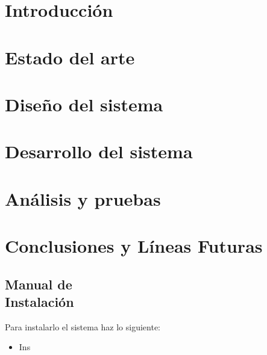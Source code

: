 \documentclass[12pt, a4paper, twoside]{article}
\begin{document}


\clearpage
\setcounter{page}{1}



\newpage



\newpage



\tableofcontents

\section{Introducción}


\section{Estado del arte}


\section{Diseño del sistema}


\section{Desarrollo del sistema}


\section{Análisis y pruebas}


\section{Conclusiones y Líneas Futuras}


\printbibliography
\newpage

\begin{umaappendices}
  \section{Manual de \\ Instalación}
  Para instalarlo el sistema haz lo siguiente:
  \begin{itemize}
    \item Ins
  \end{itemize}

\end{umaappendices}


\end{document}
